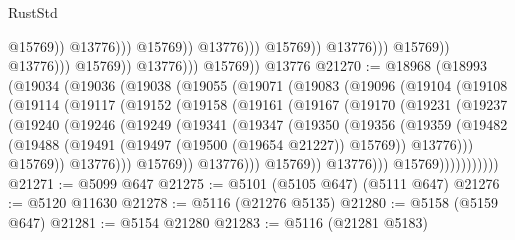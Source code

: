 \begin{lexlean}{RustStd}
\begin{coremodule}
{\begin{coremodule}
{{{{{{{{{{{{{{{{{{{{{{{{{{{{{{{                                                          @15769))
                                                      @13776)))
                                                @15769))
                                            @13776)))
                                      @15769))
                                  @13776)))
                            @15769))
                        @13776)))
                  @15769))
              @13776)))
        @15769))
    @13776
@21270 := @18968
    (@18993
      (@19034
        (@19036
          (@19038
            (@19055
              (@19071
                (@19083
                  (@19096
                    (@19104
                      (@19108
                        (@19114
                          (@19117
                            (@19152
                              (@19158
                                (@19161
                                  (@19167
                                    (@19170
                                      (@19231
                                        (@19237
                                          (@19240
                                            (@19246
                                              (@19249
                                                (@19341
                                                  (@19347
                                                    (@19350
                                                      (@19356
                                                        (@19359
                                                          (@19482
                                                            (@19488
                                                              (@19491
                                                                (@19497
                                                                  (@19500 (@19654 @21227))
                                                                  @15769))
                                                              @13776)))
                                                        @15769))
                                                    @13776)))
                                              @15769))
                                          @13776)))
                                    @15769))
                                @13776)))
                          @15769)))))))))))
@21271 := @5099 @647
@21275 := @5101 (@5105 @647) (@5111 @647)
@21276 := @5120 @11630
@21278 := @5116 (@21276 @5135)
@21280 := @5158 (@5159 @647)
@21281 := @5154 @21280
@21283 := @5116 (@21281 @5183)
}}}}}}}}}}}}}}}}}}}}}}}}}}}}}}}
\end{coremodule}}
\end{coremodule}
\end{lexlean}
